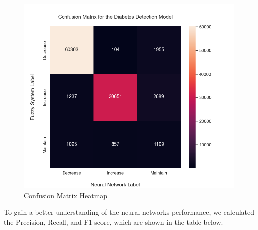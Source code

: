 \documentclass[titlepage]{article}
\begin{document}
\begin{figure}[H]
\includegraphics[width=\textwidth]{../images/classification/confusion_heatmap}
\caption{Confusion Matrix Heatmap}
\label{fig:confusion_matrix_heatmap}
\end{figure}

To gain a better understanding of the neural networks performance, we calculated the Precision, Recall, and F1-score, which are shown in the table below.

\begin{table}[H]
    \centering
    \caption{}
    \label{tab:classification_scores}
    
\end{table}
\end{document}
